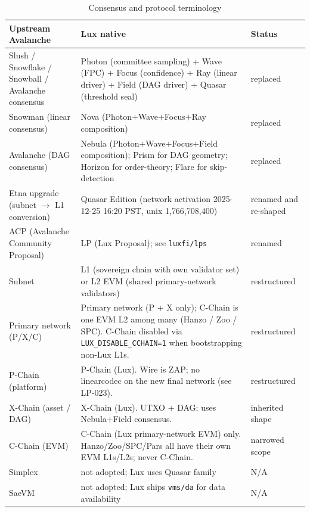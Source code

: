 \begin{table}[h]
\centering
\small
\caption{Consensus and protocol terminology}
\label{tab:trans-consensus}
\begin{tabular}{p{4.3cm} p{6.5cm} p{2.5cm}}
\toprule
\textbf{Upstream Avalanche} & \textbf{Lux native} & \textbf{Status} \\
\midrule
Slush / Snowflake / Snowball / Avalanche consensus
  & Photon (committee sampling) + Wave (FPC) + Focus (confidence) +
    Ray (linear driver) + Field (DAG driver) + Quasar (threshold seal)
  & replaced \\
Snowman (linear consensus)
  & Nova (Photon$+$Wave$+$Focus$+$Ray composition)
  & replaced \\
Avalanche (DAG consensus)
  & Nebula (Photon$+$Wave$+$Focus$+$Field composition); Prism for DAG
    geometry; Horizon for order-theory; Flare for skip-detection
  & replaced \\
Etna upgrade (subnet $\to$ L1 conversion)
  & Quasar Edition (network activation 2025-12-25 16:20 PST,
    unix 1{,}766{,}708{,}400)
  & renamed and re-shaped \\
ACP (Avalanche Community Proposal)
  & LP (Lux Proposal); see \texttt{luxfi/lps}
  & renamed \\
Subnet
  & L1 (sovereign chain with own validator set) or L2 EVM (shared
    primary-network validators)
  & restructured \\
Primary network (P/X/C)
  & Primary network (P + X only); C-Chain is one EVM L2 among many
    (Hanzo / Zoo / SPC). C-Chain disabled via \texttt{LUX\_DISABLE\_CCHAIN=1}
    when bootstrapping non-Lux L1s.
  & restructured \\
P-Chain (platform)
  & P-Chain (Lux). Wire is ZAP; no linearcodec on the new final
    network (see LP-023).
  & restructured \\
X-Chain (asset / DAG)
  & X-Chain (Lux). UTXO + DAG; uses Nebula+Field consensus.
  & inherited shape \\
C-Chain (EVM)
  & C-Chain (Lux primary-network EVM) only. Hanzo/Zoo/SPC/Pars all
    have their own EVM L1s/L2s; never C-Chain.
  & narrowed scope \\
Simplex
  & not adopted; Lux uses Quasar family
  & N/A \\
SaeVM
  & not adopted; Lux ships \texttt{vms/da} for data availability
  & N/A \\
\bottomrule
\end{tabular}
\end{table}

